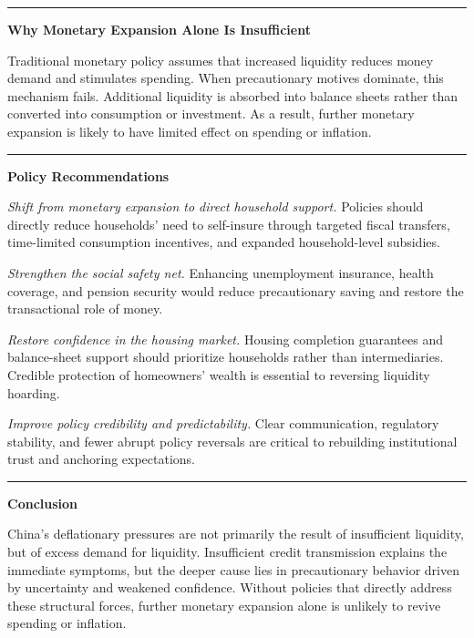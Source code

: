 \documentclass[11pt,letterpaper]{article}
\begin{document}
\noindent\rule{\textwidth}{0.4pt}

\textbf{Why Monetary Expansion Alone Is Insufficient}

Traditional monetary policy assumes that increased liquidity reduces money demand and stimulates spending. When precautionary motives dominate, this mechanism fails. Additional liquidity is absorbed into balance sheets rather than converted into consumption or investment. As a result, further monetary expansion is likely to have limited effect on spending or inflation.

\noindent\rule{\textwidth}{0.4pt}

\textbf{Policy Recommendations}

\textit{Shift from monetary expansion to direct household support.}
Policies should directly reduce households' need to self-insure through targeted fiscal transfers, time-limited consumption incentives, and expanded household-level subsidies.

\textit{Strengthen the social safety net.}
Enhancing unemployment insurance, health coverage, and pension security would reduce precautionary saving and restore the transactional role of money.

\textit{Restore confidence in the housing market.}
Housing completion guarantees and balance-sheet support should prioritize households rather than intermediaries. Credible protection of homeowners' wealth is essential to reversing liquidity hoarding.

\textit{Improve policy credibility and predictability.}
Clear communication, regulatory stability, and fewer abrupt policy reversals are critical to rebuilding institutional trust and anchoring expectations.

\noindent\rule{\textwidth}{0.4pt}

\textbf{Conclusion}

China's deflationary pressures are not primarily the result of insufficient liquidity, but of excess demand for liquidity. Insufficient credit transmission explains the immediate symptoms, but the deeper cause lies in precautionary behavior driven by uncertainty and weakened confidence. Without policies that directly address these structural forces, further monetary expansion alone is unlikely to revive spending or inflation.
\end{document}
